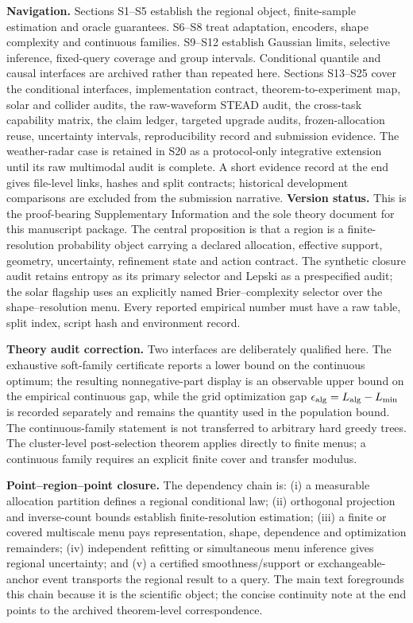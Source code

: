 \documentclass[11pt,a4paper]{article}
\numberwithin{equation}{section}
\theoremstyle{definition}\newtheorem{definition}[theorem]{Definition}
\theoremstyle{remark}\newtheorem{remark}[theorem]{Remark}
\begin{document}
\textbf{Navigation.} Sections S1--S5 establish the regional object, finite-sample estimation and oracle guarantees. S6--S8 treat adaptation, encoders, shape complexity and continuous families. S9--S12 establish Gaussian limits, selective inference, fixed-query coverage and group intervals. Conditional quantile and causal interfaces are archived rather than repeated here. Sections S13--S25 cover the conditional interfaces, implementation contract, theorem-to-experiment map, solar and collider audits, the raw-waveform STEAD audit, the cross-task capability matrix, the claim ledger, targeted upgrade audits, frozen-allocation reuse, uncertainty intervals, reproducibility record and submission evidence. The weather-radar case is retained in S20 as a protocol-only integrative extension until its raw multimodal audit is complete. A short evidence record at the end gives file-level links, hashes and split contracts; historical development comparisons are excluded from the submission narrative.
{\small\sloppy\tableofcontents}
\textbf{Version status.} This is the proof-bearing Supplementary Information and the sole theory document for this manuscript package. The central proposition is that a region is a finite-resolution probability object carrying a declared allocation, effective support, geometry, uncertainty, refinement state and action contract. The synthetic closure audit retains entropy as its primary selector and Lepski as a prespecified audit; the solar flagship uses an explicitly named Brier--complexity selector over the shape--resolution menu. Every reported empirical number must have a raw table, split index, script hash and environment record.\par
\textbf{Theory audit correction.} Two interfaces are deliberately qualified here. The exhaustive soft-family certificate reports a lower bound on the continuous optimum; the resulting nonnegative-part display is an observable upper bound on the empirical continuous gap, while the grid optimization gap $\epsilon_{\rm alg}=L_{\rm alg}-L_{\min}$ is recorded separately and remains the quantity used in the population bound. The continuous-family statement is not transferred to arbitrary hard greedy trees. The cluster-level post-selection theorem applies directly to finite menus; a continuous family requires an explicit finite cover and transfer modulus.\par

\textbf{Point--region--point closure.} The dependency chain is: (i) a measurable allocation partition defines a regional conditional law; (ii) orthogonal projection and inverse-count bounds establish finite-resolution estimation; (iii) a finite or covered multiscale menu pays representation, shape, dependence and optimization remainders; (iv) independent refitting or simultaneous menu inference gives regional uncertainty; and (v) a certified smoothness/support or exchangeable-anchor event transports the regional result to a query. The main text foregrounds this chain because it is the scientific object; the concise continuity note at the end points to the archived theorem-level correspondence.
\end{document}
